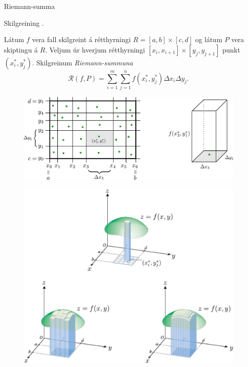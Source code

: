 \begin{frame}{Riemann-summa} 

\begin {block}{Skilgreining \kaflanr.}
  
 Látum $f$ vera fall skilgreint á rétthyrningi $R=[a,b]\times[c,d]$ og
 látum $P$ vera skiptingu á $R$.  Veljum úr hverjum rétthyrningi
 $[x_i,x_{i+1}]\times [y_j,y_{j+1}]$ punkt $(x_i^*, y_j^*)$.  
Skilgreinum \emph{Riemann-summuna}
$$\mathcal{R}(f,P)=\sum_{i=1}^m\sum_{j=1}^n f(x_i^*, y_j^*)\Delta x_i\Delta
  y_j.$$

   \begin {figure}[h!]
 \centering
            \includegraphics[width=.95\linewidth]{skipting2.pdf}
            \caption*{}
\end {figure}
\end{block}

\end{frame}

\begin {frame}
    \begin {figure}[h!]
 \centering
            \includegraphics[width=0.9\linewidth]{double.pdf}
            \caption*{}
\end {figure}
\end {frame}


